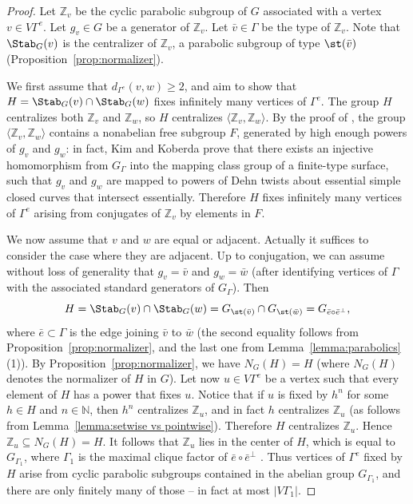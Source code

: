 \begin{proof}
Let $\mathbb Z_v$ be the cyclic parabolic subgroup of $G$ associated with a vertex $v\in V\Gamma^e$. Let $g_v\in G$ be a generator of $\mathbb Z_v$. Let $\bar v\in\Gamma$ be the type of $\mathbb Z_v$. Note that $\Stab_G(v)$ is the centralizer of $\mathbb Z_v$, a parabolic subgroup of type $\st(\bar v)$ (Proposition~\ref{prop:normalizer}).

We first assume that $d_{\Gamma^e}(v,w)\ge 2$, and aim to show that $H=\Stab_G(v)\cap\Stab_G(w)$ fixes infinitely many vertices of $\Gamma^e$. The group $H$ centralizes both $\mathbb Z_v$ and $\mathbb Z_w$, so $H$ centralizes $\langle \mathbb Z_v,\mathbb Z_w\rangle$. By the proof of \cite[Th.\,1.3]{kim2013embedability}, the group $\langle \mathbb Z_v,\mathbb Z_w\rangle$ contains a nonabelian free subgroup $F$, generated by high enough powers of $g_v$ and $g_w$: in fact, Kim and Koberda prove that there exists an injective homomorphism from $G_\Gamma$ into the mapping class group of a finite-type surface, such that $g_v$ and $g_w$ are mapped to powers of Dehn twists about essential simple closed curves that intersect essentially. Therefore $H$ fixes infinitely many vertices of $\Gamma^e$ arising from conjugates of $\mathbb Z_v$ by elements in $F$.

We now assume that $v$ and $w$ are equal or adjacent. Actually it suffices to consider the case where they are adjacent. Up to conjugation, we can assume without loss of generality that $g_v=\bar v$ and $g_w=\bar w$ (after identifying vertices of $\Gamma$ with the associated standard generators of $G_\Gamma$). Then
\[
H=\Stab_G(v)\cap\Stab_G(w)=G_{\st(\bar v)}\cap G_{\st(\bar w)}=G_{\bar e\circ \bar e^\perp},
\]
where $\bar e\subset \Gamma$ is the edge joining $\bar v$ to $\bar w$ (the second equality follows from Proposition~\ref{prop:normalizer}, and the last one from Lemma~\ref{lemma:parabolics}(1)). By Proposition~\ref{prop:normalizer}, we have \hbox{$N_G(H)\!=\!H$} (where $N_G(H)$ denotes the normalizer of $H$ in $G$). Let now $u\in V\Gamma^e$ be a vertex such that every element of $H$ has a power that fixes $u$. Notice that if $u$ is fixed by $h^n$ for some $h\in H$ and $n\in\mathbb{N}$, then $h^n$ centralizes $\mathbb Z_u$, and in fact $h$ centralizes $\mathbb Z_u$ (as follows from Lemma~\ref{lemma:setwise vs pointwise}). Therefore $H$ centralizes $\mathbb Z_u$. Hence $\mathbb Z_u\subseteq N_G(H)=H$. It follows that $\mathbb Z_u$ lies in the center of $H$, which is equal to $G_{\Gamma_1}$, where $\Gamma_1$ is the maximal clique factor of $\bar e\circ \bar e^\perp$ \cite{Ser}. Thus vertices of $\Gamma^e$ fixed by $H$ arise from cyclic parabolic subgroups contained in the abelian group $G_{\Gamma_1}$, and there are only finitely many of those -- in fact at most $|V\Gamma_1|$.
\end{proof}

